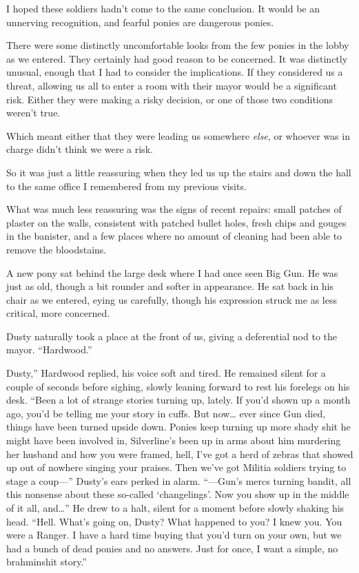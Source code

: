 I hoped these soldiers hadn’t come to the same conclusion. It would be an unnerving recognition, and fearful ponies are dangerous ponies.

There were some distinctly uncomfortable looks from the few ponies in the lobby as we entered. They certainly had good reason to be concerned. It was distinctly unusual, enough that I had to consider the implications. If they considered us a threat, allowing us all to enter a room with their mayor would be a significant risk. Either they were making a risky decision, or one of those two conditions weren’t true.

Which meant either that they were leading us somewhere \textit{else}, or whoever was in charge didn’t think we were a risk.

So it was just a little reassuring when they led us up the stairs and down the hall to the same office I remembered from my previous visits.

What was much less reassuring was the signs of recent repairs: small patches of plaster on the walls, consistent with patched bullet holes, fresh chips and gouges in the banister, and a few places where no amount of cleaning had been able to remove the bloodstains.

A new pony sat behind the large desk where I had once seen Big Gun. He was just as old, though a bit rounder and softer in appearance. He sat back in his chair as we entered, eying us carefully, though his expression struck me as less critical, more concerned.

Dusty naturally took a place at the front of us, giving a deferential nod to the mayor. “Hardwood.”

\leavevmode{}Dusty,” Hardwood replied, his voice soft and tired. He remained silent for a couple of seconds before sighing, slowly leaning forward to rest his forelegs on his desk. “Been a lot of strange stories turning up, lately. If you’d shown up a month ago, you’d be telling me your story in cuffs. But now… ever since Gun died, things have been turned upside down. Ponies keep turning up more shady shit he might have been involved in, Silverline’s been up in arms about him murdering her husband and how you were framed, hell, I’ve got a herd of zebras that showed up out of nowhere singing your praises. Then we’ve got Militia soldiers trying to stage a coup—” Dusty’s ears perked in alarm. “—Gun’s mercs turning bandit, all this nonsense about these so-called ‘changelings’. Now you show up in the middle of it all, and…” He drew to a halt, silent for a moment before slowly shaking his head. “Hell. What’s going on, Dusty? What happened to you? I knew you. You were a Ranger. I have a hard time buying that you’d turn on your own, but we had a bunch of dead ponies and no answers. Just for once, I want a simple, no brahminshit story.”

